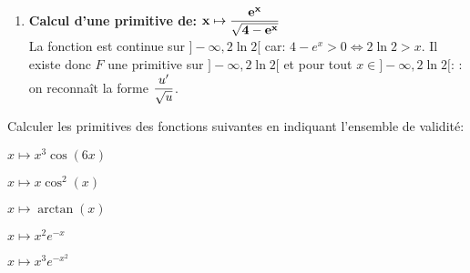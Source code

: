 \documentclass[a4paper, 11pt,reqno]{article}
\begin{document}
\begin{correction}
\begin{enumerate}
		\item \textbf{Calcul d'une primitive de: $\mathbf{ x\mapsto \displaystyle\frac{ e^x }{ \sqrt{ 4-e^x}  }} $}\\
		      \noindent La fonction est continue sur $\rbrack -\infty,2\ln{2}\lbrack$ car: $4-e^x>0\Leftrightarrow 2\ln{2}>x$. Il existe donc $F$ une primitive sur $\rbrack -\infty,2\ln{2}\lbrack$ et pour tout $x\in\rbrack -\infty,2\ln{2}\lbrack$:  : on reconna\^{i}t la forme $\displaystyle\frac{u^{\prime}}{\sqrt{u}}$.
	\end{enumerate}
\end{correction}
\begin{exercice}   \;
	Calculer les primitives des fonctions suivantes en indiquant l'ensemble de validit\'e:
	\begin{enumerate}
		\begin{minipage}[t]{0.45\textwidth}
			\item $x\mapsto x^3\cos{(6x)}$
			\item $x\mapsto x\cos^2{(x)}$
			\item $x\mapsto \arctan{(x)}$
		\end{minipage}
		\begin{minipage}[t]{0.45\textwidth}
			\item $x\mapsto x^2 e^{-x}$
			\item $x\mapsto x^3e^{-x^2}$
		\end{minipage}
	\end{enumerate}
\end{exercice}
\end{document}
